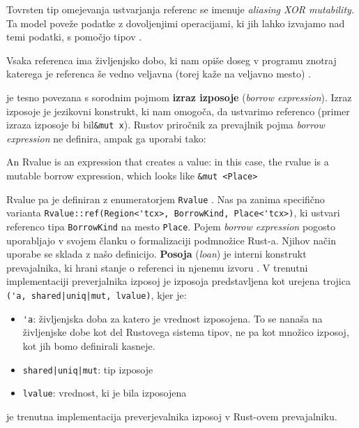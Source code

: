 \documentclass[a4paper,12pt,openright]{book}
\begin{document}
\begin{description}
	      \subitem Tovrsten tip omejevanja ustvarjanja referenc se imenuje \textit{aliasing XOR mutability}. Ta model poveže podatke
	      z dovoljenjimi operacijami, ki jih lahko izvajamo nad temi podatki, s pomočjo tipov \cite{yanovskiGhostCellSeparatingPermissions2021}.
	\item[Življenska doba (\textit{lifetime})] Vsaka referenca ima življenjsko dobo, ki nam opiše doseg v programu znotraj katerega je
	      referenca še vedno veljavna (torej kaže na veljavno mesto) \cite{klabnikRustProgrammingLanguage2023}.
	\item[Posoja (\textit{loan})] je tesno povezana s sorodnim pojmom \textbf{izraz izposoje} (\textit{borrow expression}). Izraz izposoje
	      je jezikovni konstrukt, ki nam omogoča, da ustvarimo referenco (primer izraza izposoje bi bil\verb|&mut x|).
	      Rustov priročnik za prevajlnik \cite{MIRMidlevelIR} pojma \textit{borrow expression} ne definira, ampak ga uporabi tako:
	      \begin{displayquote}
		      An Rvalue is an expression that creates a value: in this case, the rvalue is a
		      mutable borrow expression, which looks like \verb|&mut <Place>|
	      \end{displayquote}
	      Rvalue pa je definiran z enumeratorjem \verb|Rvalue| \cite{RvalueRustc_middleMira}. Nas pa zanima specifično
	      varianta \verb|Rvalue::ref(Region<'tcx>, BorrowKind, Place<'tcx>)|, ki ustvari referenco tipa \verb|BorrowKind|
	      na mesto \verb|Place|.
	      Pojem \textit{borrow expression} pogosto uporabljajo \citeauthor{weissOxideEssenceRust2019} v svojem članku o formalizaciji
	      podmnožice Rust-a. Njihov način uporabe se sklada z našo definicijo.
	      \textbf{Posoja} (\textit{loan}) je interni konstrukt prevajalnika, ki hrani stanje o referenci in njenemu izvoru
	      \cite{weissOxideEssenceRust2019}. V trenutni implementaciji preverjalnika izposoj je izposoja predstavljena kot
	      urejena trojica \cite{2094nllRustRFC} \verb=('a, shared|uniq|mut, lvalue)=, kjer je:
	      \begin{itemize}
		      \item \verb|'a|: življenjska doba za katero je vrednost izposojena. To se nanaša na življenjske dobe kot
		            del Rustovega sistema tipov, ne pa kot množico izposoj, kot jih bomo definirali kasneje.
		      \item \verb=shared|uniq|mut=: tip izposoje
		      \item \verb|lvalue|: vrednost, ki je bila izposojena
	      \end{itemize}
	\item[NLL] je trenutna implementacija preverjevalnika izposoj v Rust-ovem prevajalniku.
\end{description}
\end{document}

